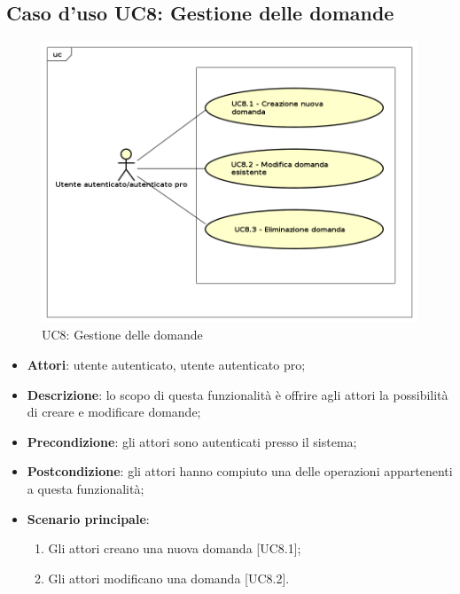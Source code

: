 \subsection{Caso d'uso UC8: Gestione delle domande}
	\label{UC8}
	\begin{figure}[h]
		\centering
			\includegraphics[scale=0.45,keepaspectratio]{UML/UC8.png}
		\caption{UC8: Gestione delle domande}
	\end{figure}
	\FloatBarrier
	\begin{itemize}
		\item
			\textbf{Attori}: utente autenticato, utente autenticato pro;
		\item		
			\textbf{Descrizione}: lo scopo di questa funzionalità è offrire agli attori la possibilità di creare e modificare domande;
		\item
			\textbf{Precondizione}: gli attori sono autenticati presso il sistema; 
		\item
			\textbf{Postcondizione}: gli attori hanno compiuto una delle operazioni appartenenti a questa funzionalità;
		\item
			\textbf{Scenario principale}:
	       		\begin{enumerate}
					\item
					Gli attori creano una nuova domanda [UC8.1];
					\item
					Gli attori modificano una domanda [UC8.2].
	 			\end{enumerate}
	\end{itemize}
